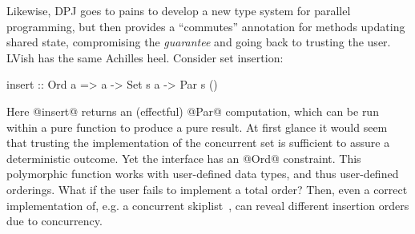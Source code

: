 Likewise, DPJ goes to pains to develop a new type system for parallel
programming, but then provides a ``commutes'' annotation for methods updating
shared state, compromising the {\em guarantee} and going back to trusting the
user. LVish has the same Achilles heel. Consider set insertion:

\begin{code}
insert :: Ord a => a -> Set s a -> Par s ()
\end{code}

Here @insert@ returns an (effectful) @Par@ computation, which can be run within a
pure function to produce a pure result.  At first glance it would seem that
trusting the implementation of the concurrent set is sufficient to assure a
deterministic outcome.  Yet the interface has an @Ord@ constraint. This
 polymorphic function works with user-defined data types, and thus
user-defined orderings.  What if the user fails to implement a total order?
Then, even a correct implementation of, e.g. a concurrent
skiplist~\cite{concurrent-skiplist}, can reveal
different insertion orders due to concurrency.





